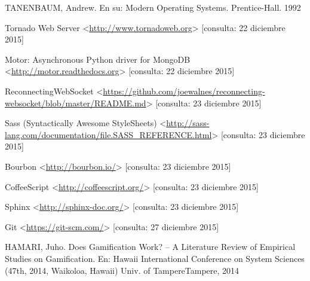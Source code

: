 \begin{thebibliography}{9}
    TANENBAUM, Andrew.
    En su: Modern Operating Systems.
    Prentice-Hall.
    1992

    Tornado Web Server
    <\url{http://www.tornadoweb.org}>
    [consulta: 22 diciembre 2015]

    Motor: Asynchronous Python driver for MongoDB
    <\url{http://motor.readthedocs.org}>
    [consulta: 22 diciembre 2015]

    ReconnectingWebSocket
    <\url{https://github.com/joewalnes/reconnecting-websocket/blob/master/README.md}>
    [consulta: 23 diciembre 2015]

    Sass (Syntactically Awesome StyleSheets)
    <\url{http://sass-lang.com/documentation/file.SASS_REFERENCE.html}>
    [consulta: 23 diciembre 2015]

    Bourbon
    <\url{http://bourbon.io/}>
    [consulta: 23 diciembre 2015]

    CoffeeScript
    <\url{http://coffeescript.org/}>
    [consulta: 23 diciembre 2015]

    Sphinx
    <\url{http://sphinx-doc.org/}>
    [consulta: 23 diciembre 2015]

    Git
    <\url{https://git-scm.com/}>
    [consulta: 27 diciembre 2015]

    HAMARI, Juho.
    Does Gamification Work? -- A Literature Review of
    Empirical Studies on Gamification.
    En: Hawaii International Conference on System Sciences
    (47th, 2014, Waikoloa, Hawaii)
    Univ. of TampereTampere,
    2014

\end{thebibliography}
